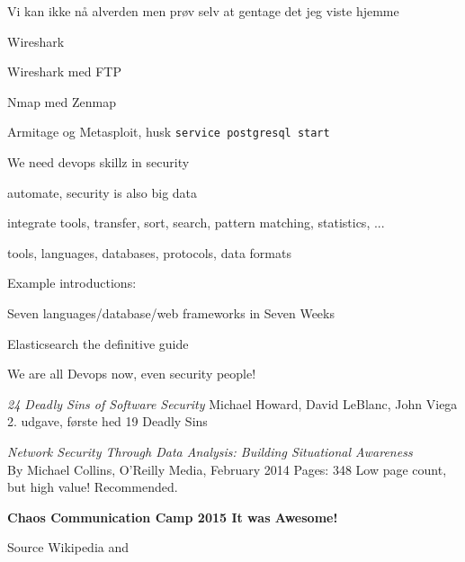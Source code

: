 \documentclass[20pt,landscape,a4paper,footrule]{foils}
\begin{document}

Vi kan ikke nå alverden men prøv selv at gentage det jeg viste hjemme
\begin{list2}
\item Wireshark
\item Wireshark med FTP
\item Nmap med Zenmap
\item Armitage og Metasploit, husk \verb+service postgresql start+
\end{list2}



\begin{list1}
\item We need devops skillz in security
\item automate, security is also big data
\item integrate tools, transfer, sort, search, pattern matching, statistics, ...
\item tools, languages, databases, protocols, data formats
\item Example introductions:
\begin{list2}
\item Seven languages/database/web frameworks in Seven Weeks
\item Elasticsearch the definitive guide\\
\item {}
\item {}
\end{list2}
\end{list1}

\centerline{We are all Devops now, even security people!}




\begin{list1}


\item \emph{24 Deadly Sins of Software Security}
Michael Howard, David LeBlanc, John Viega 2. udgave, første hed 19 Deadly Sins

\item \emph{Network Security Through Data Analysis: Building Situational Awareness}\\
By Michael Collins, O'Reilly Media, February 2014 Pages: 348
Low page count, but high value! Recommended.
\end{list1}


\centerline{\bf Chaos Communication Camp 2015 It was Awesome!}

{\small Source Wikipedia and }

\myquestionspage
\end{document}
